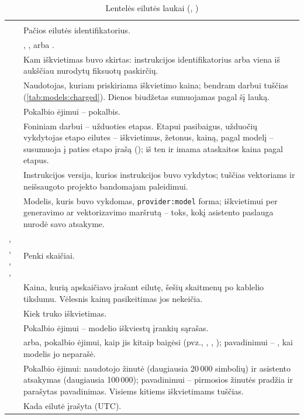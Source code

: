 \begin{xltabular}{\textwidth}{@{}L{38mm}Y@{}}
\caption{Lentelės  eilutės laukai (, )}\label{tab:models:llmcalls}\\
\toprule
{} &  \\
\midrule
\endfirsthead
\toprule
{} &  \\
\midrule
\endhead
\bottomrule
\endlastfoot
{} & Pačios eilutės identifikatorius. \\
 & , ,  arba . \\
 & Kam iškvietimas buvo skirtas: instrukcijos identifikatorius arba viena iš aukščiau nurodytų fiksuotų paskirčių. \\
 & Naudotojas, kuriam priskiriama iškvietimo kaina; bendram darbui tuščias (\cref{tab:models:charged}). Dienos biudžetas sumuojamas pagal šį lauką. \\
 & Pokalbio ėjimui -- pokalbis. \\
 & Foniniam darbui -- užduoties etapas. Etapui pasibaigus, užduočių vykdytojas etapo eilutes -- iškvietimus, žetonus, kainą, pagal modelį -- susumuoja į paties etapo įrašą (); iš ten ir imama ataskaitos kaina pagal etapus. \\
 & Instrukcijos versija, kurios instrukcijos buvo vykdytos; tuščias vektoriams ir neišsaugoto projekto bandomajam paleidimui. \\
 & Modelis, kuris buvo vykdomas, \texttt{provider:model} forma; iškvietimui per generavimo ar vektorizavimo maršrutą -- toks, kokį asistento paslauga nurodė savo atsakyme. \\
, , , ,  & Penki skaičiai. \\
 & Kaina, kurią  apskaičiavo įrašant eilutę, šešių skaitmenų po kablelio tikslumu. Vėlesnis kainų pasikeitimas jos nekeičia. \\
 & Kiek truko iškvietimas. \\
 & Pokalbio ėjimui -- modelio iškviestų įrankių sąrašas. \\
 &  arba, pokalbio ėjimui, kaip jis kitaip baigėsi (pvz., , , ); pavadinimui -- , kai modelis jo neparašė. \\
 & Pokalbio ėjimui: naudotojo žinutė (daugiausia 20\,000 simbolių) ir asistento atsakymas (daugiausia 100\,000); pavadinimui -- pirmosios žinutės pradžia ir parašytas pavadinimas. Visiems kitiems iškvietimams tuščias. \\
 & Kada eilutė įrašyta (UTC). \\
\end{xltabular}

